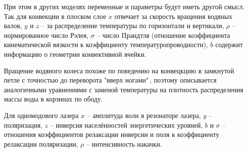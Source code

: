 \documentclass[12pt]{article}
\begin{document}
При этом в других моделях переменные и параметры будут иметь другой смысл. Так для конвекции в плоском слое $x$ отвечает за скорость вращения водяных валов, $y$ и $z$ -- за распределение температуры по горизонтали и вертикали, $\rho$ -- нормированное число Рэлея, $\sigma$ -- число Прандтля (отношение коэффициента кинематической вязкости к коэффициенту температуропроводности), $b$ содержит информацию о геометрии конвективной ячейки. 

Вращение водяного колеса похоже по поведению на конвецкцию в замкнутой петле с точностью до переворота "вверх ногами"\,, поэтому описывается аналогичными уравнениями с заменой температуры на плотность распределения массы воды в корзинах по ободу.

Для одномодового лазера $x$ -- амплитуда волн в резонаторе лазера, $y$ -- поляризация, $z$ -- инверсия населённостей энергетических уровней, $b$ и $\sigma$ -- отношения коэффициентов релаксации инверсии и поля к коэффициенту релаксации поляризации, $\rho$ -- интенсивность накачки.
\end{document}
